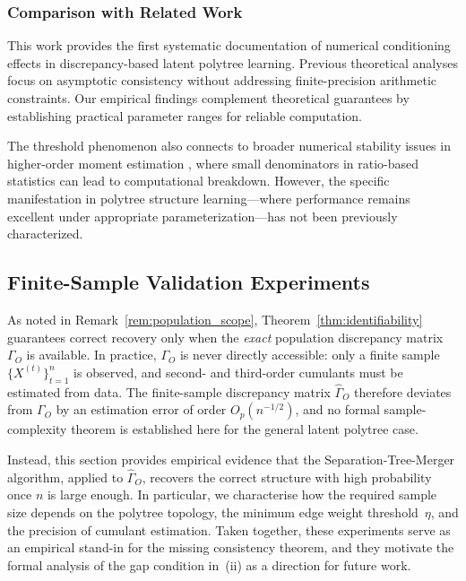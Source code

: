 \documentclass[11pt,a4paper]{article}
\numberwithin{equation}{section}
\begin{document}
\subsubsection{Comparison with Related Work}

This work provides the first systematic documentation of numerical conditioning effects in discrepancy-based latent polytree learning. Previous theoretical analyses \citep{etesami:kiyavash:coleman:2016} focus on asymptotic consistency without addressing finite-precision arithmetic constraints. Our empirical findings complement theoretical guarantees by establishing practical parameter ranges for reliable computation.

The threshold phenomenon also connects to broader numerical stability issues in higher-order moment estimation \citep{comon:jutten:handbook}, where small denominators in ratio-based statistics can lead to computational breakdown. However, the specific manifestation in polytree structure learning—where performance remains excellent under appropriate parameterization—has not been previously characterized.

\subsection{Finite-Sample Validation Experiments}
\label{subsec:finite_sample}

As noted in Remark~\ref{rem:population_scope}, Theorem~\ref{thm:identifiability}
guarantees correct recovery only when the \emph{exact} population discrepancy
matrix $\Gamma_O$ is available.  In practice, $\Gamma_O$ is never directly
accessible: only a finite sample $\{X^{(t)}\}_{t=1}^{n}$ is observed, and
second- and third-order cumulants must be estimated from data.  The
finite-sample discrepancy matrix $\hat\Gamma_O$ therefore deviates from
$\Gamma_O$ by an estimation error of order $O_p(n^{-1/2})$, and no formal
sample-complexity theorem is established here for the general latent polytree
case.

Instead, this section provides empirical evidence that the Separation-Tree-Merger
algorithm, applied to $\hat\Gamma_O$, recovers the correct structure with high
probability once $n$ is large enough.  In particular, we characterise how the
required sample size depends on the polytree topology, the minimum edge weight
threshold~$\eta$, and the precision of cumulant estimation.  Taken together,
these experiments serve as an empirical stand-in for the missing consistency
theorem, and they motivate the formal analysis of the gap condition in~(ii) as
a direction for future work.
\end{document}

